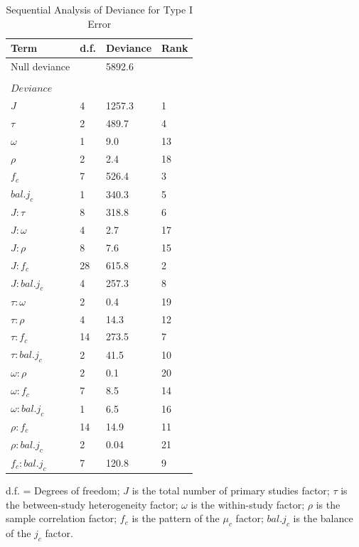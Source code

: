 \begin{table}[H]
\caption{Sequential Analysis of Deviance for Type I Error}
     \label{tab:SequentialAnalysis - Nominal Error}
    \centering
    \begin{tabular}{p{3cm}p{3cm}p{3cm}p{3cm}}
        \toprule
    Term & d.f. & Deviance & Rank \\ \midrule
       Null deviance & & 5892.6 & \\
        &&&\\
       $Deviance$ & & & \\
       $J$ & 4 & 1257.3 & 1 \\
       $\tau$ & 2 & 489.7 & 4  \\ 
       $\omega$ & 1 & 9.0 & 13 \\
       $\rho$ & 2 & 2.4 & 18 \\
       $f_c$ & 7 & 526.4 & 3 \\
       $bal. j_c$ & 1 & 340.3 & 5 \\
       $J:\tau$ & 8 & 318.8 & 6  \\ 
       $J:\omega$ & 4 & 2.7 & 17 \\
       $J:\rho$ & 8 & 7.6  & 15 \\
       $J:f_c$ & 28 & 615.8  & 2  \\
       $J:bal. j_c$ & 4 & 257.3  & 8  \\
       $\tau:\omega$ & 2 &  0.4 & 19  \\
       $\tau:\rho$ & 4 & 14.3 & 12 \\
       $\tau:f_c$ & 14 & 273.5 & 7 \\
       $\tau:bal. j_c$ & 2 & 41.5 & 10 \\
       $\omega:\rho$ & 2 & 0.1 & 20 \\
       $\omega:f_c$ & 7 & 8.5 & 14 \\
       $\omega:bal. j_c$ & 1 & 6.5 & 16 \\
       $\rho:f_c$ & 14 & 14.9 & 11 \\
       $\rho:bal. j_c$ & 2 & 0.04 & 21 \\ 
       $f_c:bal. j_c$ & 7 & 120.8 & 9 \\
        \bottomrule
    \end{tabular}
   
    \small
      d.f. = Degrees of freedom; $J$ is the total number of primary studies factor; $\tau$ is the between-study heterogeneity factor; $\omega$ is the within-study factor; $\rho$ is the sample correlation factor; $f_c$ is the pattern of the $\mu_c$ factor; $bal. j_c$ is the balance of the $j_c$ factor. 
\end{table}

